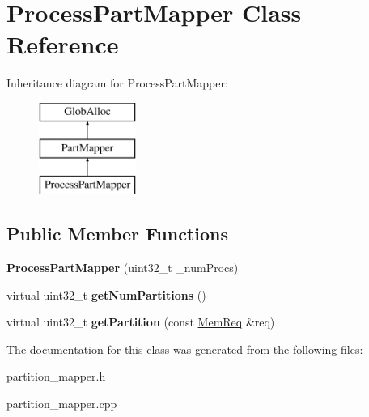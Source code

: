 \hypertarget{classProcessPartMapper}{\section{Process\-Part\-Mapper Class Reference}
\label{classProcessPartMapper}
}
Inheritance diagram for Process\-Part\-Mapper\-:\begin{figure}[H]
\begin{center}
\leavevmode
\includegraphics[height=3.000000cm]{classProcessPartMapper}
\end{center}
\end{figure}
\subsection*{Public Member Functions}
\begin{DoxyCompactItemize}
\item 
\hypertarget{classProcessPartMapper_a0a5d4d9e984ce490c32a6f1a2d846c3e}{{\bfseries Process\-Part\-Mapper} (uint32\-\_\-t \-\_\-num\-Procs)}\label{classProcessPartMapper_a0a5d4d9e984ce490c32a6f1a2d846c3e}

\item 
\hypertarget{classProcessPartMapper_a34ac12ba6242b4dc54fe5026f4d4dde7}{virtual uint32\-\_\-t {\bfseries get\-Num\-Partitions} ()}\label{classProcessPartMapper_a34ac12ba6242b4dc54fe5026f4d4dde7}

\item 
\hypertarget{classProcessPartMapper_a41b337ee1bef5e54d4c4899d3f6fe8ad}{virtual uint32\-\_\-t {\bfseries get\-Partition} (const \hyperlink{structMemReq}{Mem\-Req} \&req)}\label{classProcessPartMapper_a41b337ee1bef5e54d4c4899d3f6fe8ad}

\end{DoxyCompactItemize}


The documentation for this class was generated from the following files\-:\begin{DoxyCompactItemize}
\item 
partition\-\_\-mapper.\-h\item 
partition\-\_\-mapper.\-cpp\end{DoxyCompactItemize}
